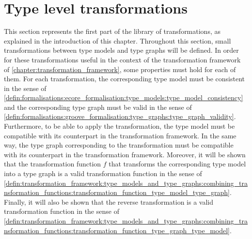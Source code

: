 \section{Type level transformations}
\label{sec:library_of_transformations:type_level_transformations}

This section represents the first part of the library of transformations, as explained in the introduction of this chapter. Throughout this section, small transformations between type models and type graphs will be defined. In order for these transformations useful in the context of the transformation framework of \cref{chapter:transformation_framework}, some properties must hold for each of them. For each transformation, the corresponding type model must be consistent in the sense of \cref{defin:formalisations:ecore_formalisation:type_models:type_model_consistency} and the corresponding type graph must be valid in the sense of \cref{defin:formalisations:groove_formalisation:type_graphs:type_graph_validity}. Furthermore, to be able to apply the transformation, the type model must be compatible with its counterpart in the transformation framework. In the same way, the type graph corresponding to the transformation must be compatible with its counterpart in the transformation framework. Moreover, it will be shown that the transformation function $f$ that transforms the corresponding type model into a type graph is a valid transformation function in the sense of \cref{defin:transformation_framework:type_models_and_type_graphs:combining_transformation_functions:transformation_function_type_model_type_graph}. Finally, it will also be shown that the reverse transformation is a valid transformation function in the sense of \cref{defin:transformation_framework:type_models_and_type_graphs:combining_transformation_functions:transformation_function_type_graph_type_model}.










